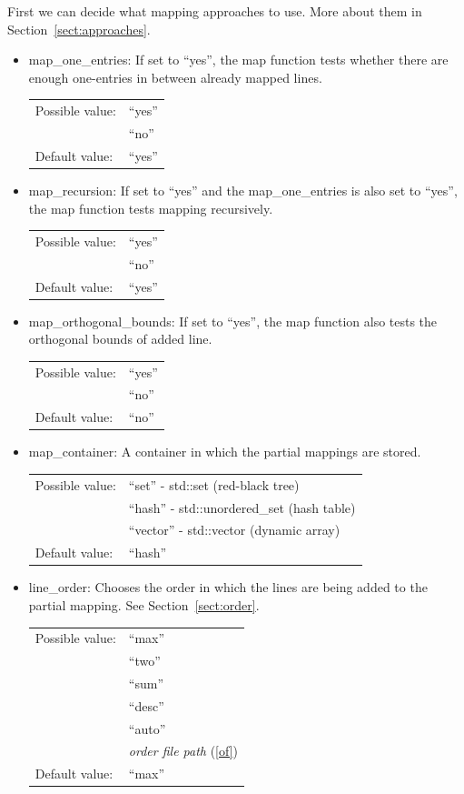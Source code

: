 First we can decide what mapping approaches to use. More about them in Section~\ref{sect:approaches}.
\begin{itemize}
\item map\_one\_entries: If set to ``yes'', the map function tests whether there are enough one-entries in between already mapped lines.

\begin{tabular}{ll}
Possible value: & ``yes'' \\
& ``no'' \\
Default value: & ``yes''
\end{tabular}

\item map\_recursion: If set to ``yes'' and the map\_one\_entries is also set to ``yes'', the map function tests mapping recursively.

\begin{tabular}{ll}
Possible value: & ``yes'' \\
& ``no'' \\
Default value: & ``yes''
\end{tabular}

\item map\_orthogonal\_bounds: If set to ``yes'', the map function also tests the orthogonal bounds of added line.

\begin{tabular}{ll}
Possible value: & ``yes'' \\
& ``no'' \\
Default value: & ``no''
\end{tabular}
\end{itemize}

\begin{itemize}
\item map\_container: A container in which the partial mappings are stored.

\begin{tabular}{ll}
Possible value: & ``set'' - std::set (red-black tree) \\
& ``hash'' - std::unordered\_set (hash table) \\
& ``vector'' - std::vector (dynamic array) \\
Default value: & ``hash''
\end{tabular}

\item line\_order: Chooses the order in which the lines are being added to the partial mapping. See Section~\ref{sect:order}.

\begin{tabular}{ll}
Possible value: & ``max'' \\
& ``two'' \\
& ``sum'' \\
& ``desc'' \\
& ``auto'' \\
& \textit{order file path} (\ref{of}) \\
Default value: & ``max''
\end{tabular}

\end{itemize}
